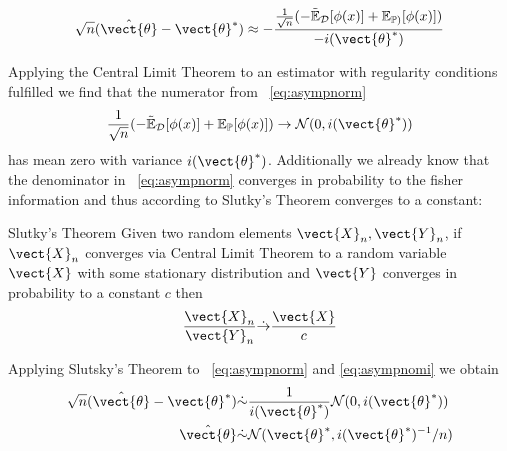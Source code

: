       \begin{equation}
        \label{eq:asympnorm}
          \begin{split}
            \sqrt{n}(\hat{\vect{\theta}} - \vect{\theta}^*)  &\approx - \frac{\frac{1}{\sqrt{n}}( -\tilde{\mathbb{E}}_{\mathcal{D}}[\phi(x)] + \mathbb{E}_{\mathbb{P})}[\phi(x)])}{- i(\vect{\theta}^*)} \\
          \end{split}
      \end{equation}

      Applying the Central Limit Theorem to an estimator with regularity conditions fulfilled we find  that the numerator from \eq~\ref{eq:asympnorm}
        \begin{equation}
            \label{eq:asympnomi}
            \frac{1}{\sqrt{n}} ( -\tilde{\mathbb{E}}_{\mathcal{D}}[\phi(x)] + \mathbb{E}_{\mathbb{P}}[\phi(x)]) \rightarrow \mathcal{N}(0, i(\vect{\theta}^*))
        \end{equation}
        has mean zero with variance $i(\vect{\theta}^*)$.
        Additionally we already know that the denominator in \eq~\ref{eq:asympnorm} converges in probability to the fisher information and thus according to Slutky's Theorem converges to a constant:

        \begin{threm}{Slutky's Theorem \cite{casella2002statistical}}
            Given two random elements $\vect{X}_n, \vect{Y}_n$, if $\vect{X}_n$ converges via Central Limit Theorem to a random variable $\vect{X}$ with some stationary distribution and $\vect{Y}$ converges in probability to a constant $c$ then 
            \begin{equation}
                \frac{\vect{X}_n}{\vect{Y}_n} \dot{\rightarrow} \frac{\vect{X}}{c}
            \end{equation}
        \end{threm}

        Applying Slutsky's Theorem to \eq~\ref{eq:asympnorm} and \ref{eq:asympnomi} we obtain 
        \begin{equation}
            \begin{split}
            \sqrt{n}(\hat{\vect{\theta}} - \vect{\theta}^*)  &\dot{\sim} \frac{1}{ i(\vect{\theta}^*)} \mathcal{N}(0, i(\vect{\theta}^*)) \\
            \hat{\vect{\theta}} &\dot{\sim} \mathcal{N}(\vect{\theta}^*, i(\vect{\theta}^*)^{-1}/n)\\
        \end{split}
        \end{equation}

